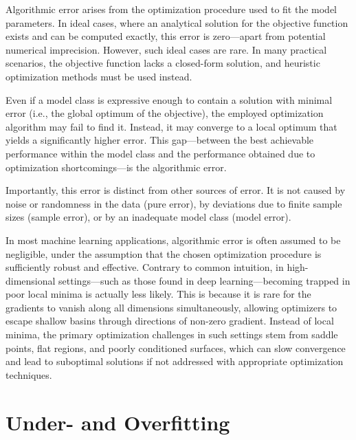 \documentclass[12pt,openany, draft]{book}
\begin{document}
Algorithmic error arises from the optimization procedure used to fit the model parameters. In ideal cases, where an analytical solution for the objective function exists and can be computed exactly, this error is zero—apart from potential numerical imprecision. However, such ideal cases are rare. In many practical scenarios, the objective function lacks a closed-form solution, and heuristic optimization methods must be used instead. \newline

Even if a model class is expressive enough to contain a solution with minimal error (i.e., the global optimum of the objective), the employed optimization algorithm may fail to find it. Instead, it may converge to a local optimum that yields a significantly higher error. This gap—between the best achievable performance within the model class and the performance obtained due to optimization shortcomings—is the algorithmic error. \newline

Importantly, this error is distinct from other sources of error. It is not caused by noise or randomness in the data (pure error), by deviations due to finite sample sizes (sample error), or by an inadequate model class (model error). \newline

In most machine learning applications, algorithmic error is often assumed to be negligible, under the assumption that the chosen optimization procedure is sufficiently robust and effective. Contrary to common intuition, in high-dimensional settings—such as those found in deep learning—becoming trapped in poor local minima is actually less likely. This is because it is rare for the gradients to vanish along all dimensions simultaneously, allowing optimizers to escape shallow basins through directions of non-zero gradient. Instead of local minima, the primary optimization challenges in such settings stem from saddle points, flat regions, and poorly conditioned surfaces, which can slow convergence and lead to suboptimal solutions if not addressed with appropriate optimization techniques.



\section{Under- and Overfitting}
\end{document}
